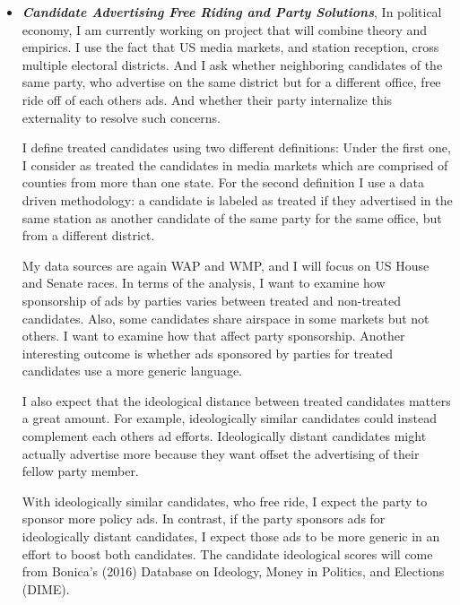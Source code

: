 \documentclass[12pt]{article}
\theoremstyle{plain}
\theoremstyle{plain}
\theoremstyle{plain}
\theoremstyle{plain}
\theoremstyle{plain}
\theoremstyle{plain}
\begin{document}
\begin{itemize}
\item \emph{\textbf{Candidate Advertising Free Riding and Party Solutions}},
In political economy, I am currently working on project that will combine theory and empirics.
I use the fact that US media markets, and station reception, cross multiple electoral districts.
And I ask whether neighboring candidates of the same party, who advertise on the same district but for a different office, free ride off of each others ads.
And whether their party internalize this externality to resolve such concerns.

I define treated candidates using two different definitions:
Under the first one, I consider as treated the candidates in media markets which are comprised of counties from more than one state.
For the second definition I use a data driven methodology: a candidate is labeled as treated if they advertised in the same station as another candidate of the same party for the same office, but from a different district.

My data sources are again WAP and WMP, and I will focus on US House and Senate races.
In terms of the analysis, I want to examine how sponsorship of ads by parties varies between treated and non-treated candidates.
Also, some candidates share airspace in some markets but not others. I want to examine how that affect party sponsorship.
Another interesting outcome is whether ads sponsored by parties for treated candidates use a more generic language.

I also expect that the ideological distance between treated candidates matters a great amount.
For example, ideologically similar candidates could instead complement each others ad efforts.
Ideologically distant candidates might actually advertise more because they want offset the advertising of their fellow party member.

With ideologically similar candidates, who free ride, I expect the party to sponsor more policy ads.
In contrast, if the party sponsors ads for ideologically distant candidates, I expect those ads to be more generic in an effort to boost both candidates.
The candidate ideological scores will come from Bonica's (2016) Database on Ideology, Money in Politics, and Elections (DIME).


\end{itemize}
\end{document}
